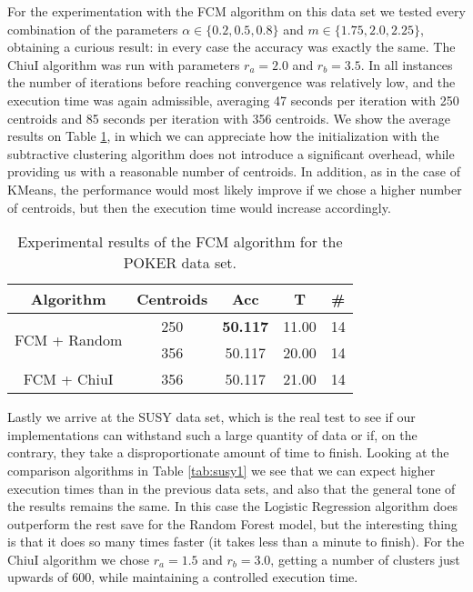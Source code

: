 For the experimentation with the FCM algorithm on this data set we tested every combination of the parameters $\alpha \in \{0.2,0.5,0.8\}$ and $m \in \{1.75,2.0,2.25\}$, obtaining a curious result: in every case the accuracy was exactly the same. The ChiuI algorithm was run with parameters $r_a=2.0$ and $r_b=3.5$. In all instances the number of iterations before reaching convergence was relatively low, and the execution time was again admissible, averaging 47 seconds per iteration with 250 centroids and 85 seconds per iteration with 356 centroids. We show the average results on Table \ref{tab:poker2}, in which we can appreciate how the initialization with the subtractive clustering algorithm does not introduce a significant overhead, while providing us with a reasonable number of centroids. In addition, as in the case of KMeans, the performance would most likely improve if we chose a higher number of centroids, but then the execution time would increase accordingly.

\begin{table}[h!]
\centering
\caption{Experimental results of the FCM algorithm for the POKER data set.}
\label{tab:poker2}
\begin{tabular}{ccccc}
\toprule
Algorithm & Centroids & Acc & T & \#\\ \midrule
\multirow{2}{*}{FCM + Random} &250 & \textbf{50.117} & 11.00 & 14\\
 & 356 & 50.117 & 20.00 & 14\\
FCM + ChiuI & 356 & 50.117 & 21.00 & 14\\ \bottomrule
\end{tabular}
\end{table}

Lastly we arrive at the SUSY data set, which is the real test to see if our implementations can withstand such a large quantity of data or if, on the contrary, they take a disproportionate amount of time to finish. Looking at the comparison algorithms in Table \ref{tab:susy1} we see that we can expect higher execution times than in the previous data sets, and also that the general tone of the results remains the same. In this case the Logistic Regression algorithm does outperform the rest save for the Random Forest model, but the interesting thing is that it does so many times faster (it takes less than a minute to finish). For the ChiuI algorithm we chose $r_a=1.5$ and $r_b=3.0$, getting a number of clusters just upwards of 600, while maintaining a controlled execution time.

